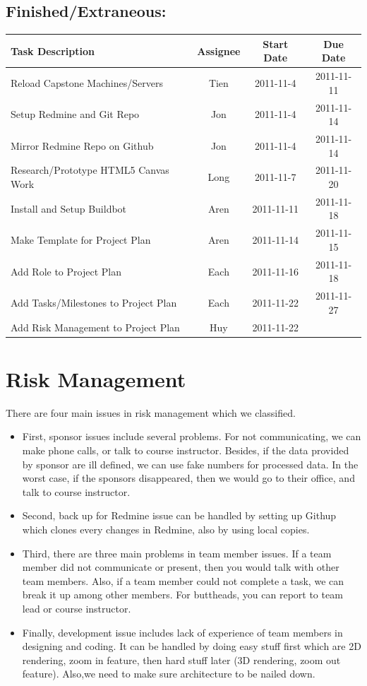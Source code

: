 \documentclass[12pt, letterpaper]{article}
\begin{document}
	\subsection{Finished/Extraneous:}

  \begin{center}
    \begin{tabular}{| p{8.3cm} || c | c | c | }
      \hline
      Task Description & Assignee & Start Date & Due Date \\
      \hline
			Reload Capstone Machines/Servers & Tien & 2011-11-4 & 2011-11-11\\
			Setup Redmine and Git Repo & Jon & 2011-11-4 & 2011-11-14 \\
			Mirror Redmine Repo on Github & Jon & 2011-11-4 & 2011-11-14 \\
			Research/Prototype HTML5 Canvas Work & Long & 2011-11-7 & 2011-11-20 \\
      Install and Setup Buildbot & Aren & 2011-11-11 & 2011-11-18 \\
      Make Template for Project Plan & Aren & 2011-11-14 & 2011-11-15 \\
			Add Role to Project Plan & Each & 2011-11-16 & 2011-11-18 \\
			Add Tasks/Milestones to Project Plan & Each & 2011-11-22 & 2011-11-27\\
			Add Risk Management to Project Plan & Huy & 2011-11-22 & \\
      \hline
    \end{tabular}
  \end{center}

\section{Risk Management}
There are four main issues in risk management which we classified. 
\begin{itemize}
     \item First, sponsor issues include several problems. For not
    communicating, we can make phone calls, or talk to course
    instructor. Besides, if the data provided by sponsor are ill defined, we can use fake numbers for processed data. In the worst case, if the sponsors disappeared, then we would go to their office, and talk to course instructor. 
    \item Second, back up for Redmine issue can be handled by setting up Githup which clones every changes in Redmine, also by using local copies.
    \item Third, there are three main problems in team member issues. If a team member did not communicate or present, then you would talk with other team members. Also, if a team member could not complete a task, we can break it up among other members. For buttheads, you can report to team lead or course instructor.
     \item Finally, development issue includes lack of experience of team members in designing and coding. It can be handled by doing easy stuff first which are 2D rendering, zoom in feature, then hard stuff later (3D rendering, zoom out feature). Also,we need to make sure architecture to be nailed down.
\end{itemize}
\end{document}
